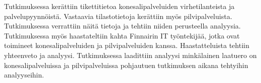 Tutkimuksessa kerättiin tikettitietoa konesalipalveluiden virhetilanteista ja palvelupyynnöistä. Vastaavia tilastotietoja kerättiin myös pilvipalveluista. Tutkimuksessa verrattiin näitä tietoja ja tehtiin niiden perusteella analyysia. Tutkimuksessa myös haastateltiin kahta Finnairin IT työntekijää, jotka ovat toimineet konesalipalveluiden ja pilvipalveluiden kanssa. Haastatteluista tehtiin yhteenveto ja analyysi. Tutkimuksessa laadittiin analyysi minkälainen laatuero on konesalipalveluissa ja pilvipalveluissa pohjautuen tutkimuksen aikana tehtyihin analyyseihin.

